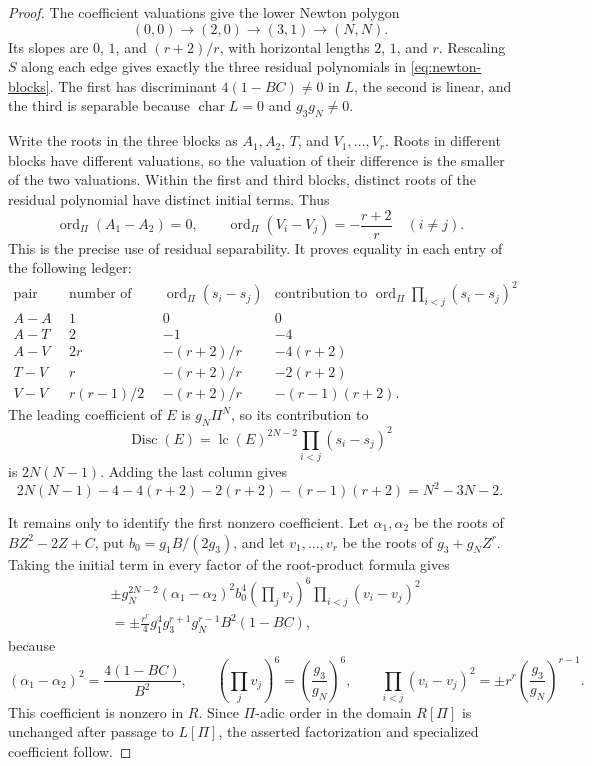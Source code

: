 \begin{proof}
The coefficient valuations give the lower Newton polygon
\[
 (0,0)\longrightarrow(2,0)\longrightarrow(3,1)
 \longrightarrow(N,N).
\]
Its slopes are \(0\), \(1\), and \((r+2)/r\), with horizontal lengths
\(2\), \(1\), and \(r\).  Rescaling \(S\) along each edge gives exactly the
three residual polynomials in \eqref{eq:newton-blocks}.  The first has
discriminant \(4(1-BC)\neq0\) in \(L\), the second is linear, and the third
is separable because \(\operatorname{char}L=0\) and \(g_3g_N\neq0\).

Write the roots in the three blocks as \(A_1,A_2\), \(T\), and
\(V_1,\ldots,V_r\).  Roots in different blocks have different valuations,
so the valuation of their difference is the smaller of the two
valuations.  Within the first and third blocks, distinct roots of the
residual polynomial have distinct initial terms.  Thus
\[
 \operatorname{ord}_\Pi(A_1-A_2)=0,\qquad
 \operatorname{ord}_\Pi(V_i-V_j)=-\frac{r+2}{r}\quad(i\neq j).
\]
This is the precise use of residual separability.  It proves equality in
each entry of the following ledger:
\[
\begin{array}{c|c|c|c}
\text{pair type}&\text{number of pairs}&
\operatorname{ord}_\Pi(s_i-s_j)&
\text{contribution to }\operatorname{ord}_\Pi\prod_{i<j}(s_i-s_j)^2\\ \hline
A\!-\!A&1&0&0\\
A\!-\!T&2&-1&-4\\
A\!-\!V&2r&-(r+2)/r&-4(r+2)\\
T\!-\!V&r&-(r+2)/r&-2(r+2)\\
V\!-\!V&r(r-1)/2&-(r+2)/r&-(r-1)(r+2).
\end{array}
\]
The leading coefficient of \(E\) is \(g_N\Pi^N\), so its contribution to
\[
 \operatorname{Disc}(E)
 =\operatorname{lc}(E)^{2N-2}\prod_{i<j}(s_i-s_j)^2
\]
is \(2N(N-1)\).  Adding the last column gives
\[
 2N(N-1)-4-4(r+2)-2(r+2)-(r-1)(r+2)
 =N^2-3N-2.
\]

It remains only to identify the first nonzero coefficient.  Let
\(\alpha_1,\alpha_2\) be the roots of \(BZ^2-2Z+C\), put
\(b_0=g_1B/(2g_3)\), and let \(v_1,\ldots,v_r\) be the roots of
\(g_3+g_NZ^r\).  Taking the initial term in every factor of the root-product
formula gives
\begin{align*}
 &\pm g_N^{2N-2}
 (\alpha_1-\alpha_2)^2 b_0^4
 \left(\prod_jv_j\right)^6
 \prod_{i<j}(v_i-v_j)^2\\
 &=\pm\frac{r^r}{4}
 g_1^4g_3^{r+1}g_N^{r-1}B^2(1-BC),
\end{align*}
because
\[
 (\alpha_1-\alpha_2)^2=\frac{4(1-BC)}{B^2},\qquad
 \left(\prod_jv_j\right)^6=\left(\frac{g_3}{g_N}\right)^6,
\qquad
 \prod_{i<j}(v_i-v_j)^2
 =\pm r^r\left(\frac{g_3}{g_N}\right)^{r-1}.
\]
This coefficient is nonzero in \(R\).  Since \(\Pi\)-adic order in the
domain \(R[\Pi]\) is unchanged after passage to \(L[\Pi]\), the asserted
factorization and specialized coefficient follow.
\end{proof}

